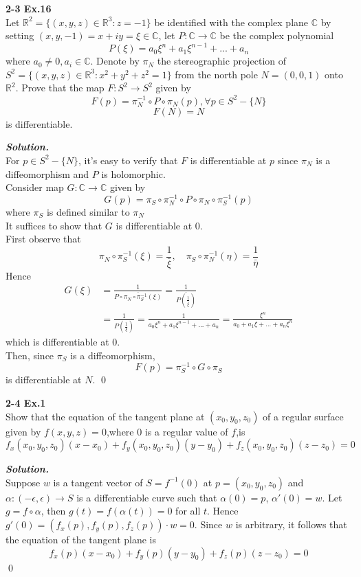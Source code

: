 \documentclass{article}
\begin{document}
\par
\textbf{2-3 Ex.16}\\
Let $\mathbb{R}^2=\{(x,y,z)\in \mathbb{R}^3:z=-1\}$
be identified with the complex plane $\mathbb{C}$
by setting $(x,y,-1)=x+iy=\xi \in \mathbb{C}$,
let $P:\mathbb{C}\to \mathbb{C}$ be the complex
polynomial
$$
P(\xi)=a_0 \xi^n + a_1 \xi^{n-1} + ... + a_n
$$
where $a_0 \neq 0, a_i \in \mathbb{C}$.
Denote by $\pi_N$ the stereographic projection of
$S^2=\{(x,y,z)\in \mathbb{R}^3: x^2+y^2+z^2=1\}$
from the north pole $N=(0,0,1)$ onto $\mathbb{R}^2$.
Prove that the map $F:S^2 \to S^2$ given by
$$
    F(p)=\pi_N^{-1} \circ P \circ \pi_N(p), \forall p \in S^2 - \{N\}
$$
$$
    F(N)=N
$$
is differentiable.

\par
\textbf{\textit{Solution.}}\\
For $p \in S^2-\{N\}$, it's easy to verify that $F$ is 
differentiable at $p$ since $\pi_N$ is a diffeomorphism
and $P$ is holomorphic.\\
Consider map $G: \mathbb{C} \to \mathbb{C}$ given by
$$
    G(p)=\pi_S \circ \pi_N^{-1} \circ P \circ \pi_N \circ \pi_S^{-1}(p)
$$
where $\pi_S$ is defined similar to $\pi_N$\\
It suffices to show that $G$ is differentiable at $0$.\\
First observe that 
$$
    \pi_N \circ \pi_S^{-1}(\xi)=\frac{1}{\bar{\xi}}, \quad
    \pi_S \circ \pi_N^{-1}(\eta) = \frac{1}{\bar{\eta}}
$$
Hence
$$
\begin{aligned}
    G(\xi)&=\frac{1}{\overline{P\circ \pi_N \circ \pi_S^{-1}(\xi)}}=\frac{1}{\overline{P(\frac{1}{\bar{\xi}})}}\\
    &=\frac{1}{P(\frac{1}{\xi})} = \frac{1}{a_0\xi^n+a_1\xi^{n-1}+...+a_n}=\frac{\xi^n}{a_0+a_1\xi+...+a_n\xi^n}
\end{aligned}
$$
which is differentiable at $0$.\\
Then, since $\pi_S$ is a diffeomorphism,
$$
    F(p) = \pi_S^{-1} \circ G \circ \pi_S
$$
is differentiable at $N$. \qed

\par
\textbf{2-4 Ex.1}\\
Show that the equation of the tangent plane at $(x_0,y_0,z_0)$
of a regular surface given by $f(x,y,z)=0$,where $0$ is a
regular value of $f$,is
$$
    f_x(x_0,y_0,z_0)(x-x_0)+f_y(x_0,y_0,z_0)(y-y_0)+f_z(x_0,y_0,z_0)(z-z_0)=0
$$

\par
\textbf{\textit{Solution.}}\\
Suppose $w$ is a tangent vector of $S=f^{-1}(0)$ at $p=(x_0,y_0,z_0)$
and $\alpha: (-\epsilon, \epsilon) \to S$ is a differentiable
curve such that $\alpha(0)=p$, $\alpha'(0)=w$. Let
$g=f\circ \alpha$, then $g(t)=f(\alpha(t))=0$ for all $t$.
Hence $g'(0)=(f_x(p),f_y(p),f_z(p)) \cdot w = 0$.
Since $w$ is arbitrary, it follows that the equation of the
tangent plane is
$$
    f_x(p)(x-x_0)+f_y(p)(y-y_0)+f_z(p)(z-z_0)=0
$$
\qed
\end{document}
